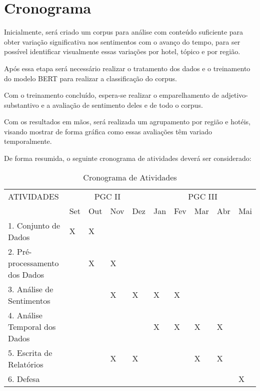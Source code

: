 \chapter{Cronograma}
\label{cap:cronograma}


Inicialmente, será criado um corpus para análise com conteúdo suficiente para obter variação significativa nos sentimentos com o avanço do tempo, para ser possível identificar visualmente essas variações por hotel, tópico e por região.

Após essa etapa será necessário realizar o tratamento dos dados e o treinamento do modelo BERT para realizar a classificação do corpus.

Com o treinamento concluído, espera-se realizar o emparelhamento de adjetivo-substantivo e a avaliação de sentimento deles e de todo o corpus.

Com os resultados em mãos, será realizada um agrupamento por região e hotéis, visando mostrar de forma gráfica como essas avaliações têm variado temporalmente.

De forma resumida, o seguinte cronograma de atividades deverá ser considerado:

\begin{table}[H]
\centering
{\footnotesize
\doublespacing
\begin{tabular}{|p{6.1cm}|l|l|l|l|l|l|l|l|l|}
\hline
\multirow{}{}{ATIVIDADES}
& \multicolumn{4}{c|}{PGC II} & \multicolumn{5}{c|}{PGC III} \\ \cline{2-10}
& Set  & Out  & Nov  & Dez & Jan & Fev & Mar & Abr & Mai \\ \hline
1. Conjunto de Dados                   & X  & X &  &  &   &   &   &  &       \\ \hline
2. Pré-processamento dos Dados                         &   & X  & X  &   &  &  &  &    &         \\ \hline
3. Análise de Sentimentos               
 &  &   & X & X & X & X &  &  &  \\ 
 \hline
4. Análise Temporal dos Dados                                   &     &     &     &     & X   & X   & X    &  X  &       \\ \hline
5. Escrita de Relatórios                                    &     &     &  X  &  X  &    &    & X   & X   &      \\ \hline
6. Defesa                                    &     &     &    &    &    &    &    &    & X     \\ \hline

\end{tabular}}
\caption{Cronograma de Atividades}
\label{tab:cronograma}
\end{table}
